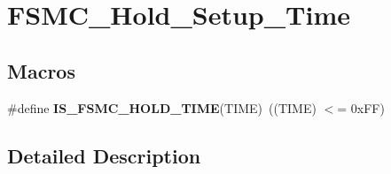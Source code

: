 \hypertarget{group___f_s_m_c___hold___setup___time}{}\section{F\+S\+M\+C\+\_\+\+Hold\+\_\+\+Setup\+\_\+\+Time}
\label{group___f_s_m_c___hold___setup___time}
\subsection*{Macros}
\begin{DoxyCompactItemize}
\item 
\hypertarget{group___f_s_m_c___hold___setup___time_gab2abc8eb967495f2a2bafec8162d6385}{}\#define {\bfseries I\+S\+\_\+\+F\+S\+M\+C\+\_\+\+H\+O\+L\+D\+\_\+\+T\+I\+M\+E}(T\+I\+M\+E)~((T\+I\+M\+E) $<$= 0x\+F\+F)\label{group___f_s_m_c___hold___setup___time_gab2abc8eb967495f2a2bafec8162d6385}

\end{DoxyCompactItemize}


\subsection{Detailed Description}
